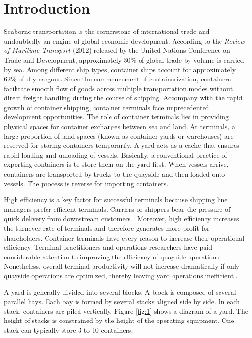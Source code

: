 \documentclass[review,3p,times,authoryear,12pt]{elsarticle}
\begin{document}
\section{Introduction}

Seaborne transportation is the cornerstone of international trade and undoubtedly an engine of global economic development.
According to the \textit{Review of Maritime Transport} (2012) released by the United Nations Conference on Trade and Development, approximately 80\% of global trade by volume is carried by sea.
Among different ship types, container ships account for approximately 62\% of dry cargoes.
Since the commencement of containerization, containers facilitate smooth flow of goods across multiple transportation modes without direct freight handling during the course of shipping.
Accompany with the rapid growth of container shipping, container terminals face unprecedented development opportunities.
The role of container terminals lies in providing physical spaces for container exchanges between sea and land.
At terminals, a large proportion of land spaces (known as container yards or warehouses) are reserved for storing containers temporarily.
A yard acts as a cache that ensures rapid loading and unloading of vessels.
Basically, a conventional practice of exporting containers is to store them on the yard first.
When vessels arrive, containers are transported by trucks to the quayside and then loaded onto vessels.
The process is reverse for importing containers.

High efficiency is a key factor for successful terminals because shipping line managers prefer efficient terminals.
Carriers or shippers bear the pressure of quick delivery from downstream customers \citep{Aguezzoul2014}.
Moreover, high efficiency increases the turnover rate of terminals and therefore generates more profit for shareholders.
Container terminals have every reason to increase their operational efficiency.
Terminal practitioners and operations researchers have paid considerable attention to improving the efficiency of quayside operations.
Nonetheless, overall terminal productivity will not increase dramatically if only quayside operations are optimized, thereby leaving yard operations inefficient \citep{Jiang2012}.

A yard is generally divided into several blocks.
A block is composed of several parallel bays.
Each bay is formed by several stacks aligned side by side.
In each stack, containers are piled vertically.
Figure \ref{fig:1} shows a diagram of a yard.
The height of stacks is constrained by the height of the operating equipment.
One stack can typically store 3 to 10 containers.
\end{document}
